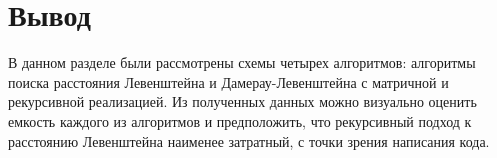 \documentclass[12pt]{report}
\begin{document}
\begin{figure}[ht!]
\end{figure}

\begin{figure}[ht!]
\end{figure}

\section{Вывод}
В данном разделе были рассмотрены схемы четырех алгоритмов: алгоритмы поиска расстояния Левенштейна и Дамерау-Левенштейна с матричной и рекурсивной реализацией. Из полученных данных можно визуально оценить емкость каждого из алгоритмов и предположить, что рекурсивный подход к расстоянию Левенштейна наименее затратный, с точки зрения написания кода.
\end{document}
